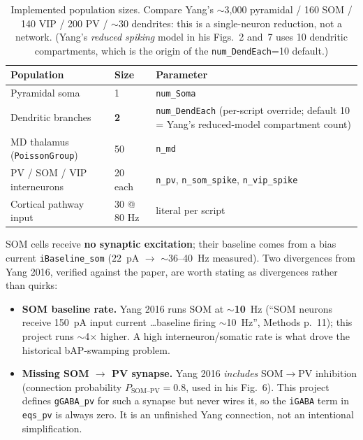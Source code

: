 \documentclass[11pt,a4paper]{article}
\begin{document}
\begin{table}[H]
    \centering
    \small
    \begin{tabular}{@{}lll@{}}
    \toprule
    \textbf{Population} & \textbf{Size} & \textbf{Parameter} \\ \midrule
    Pyramidal soma                & 1           & \texttt{num\_Soma} \\
    Dendritic branches            & \textbf{2}  & \texttt{num\_DendEach} (per-script override; default 10 = Yang's reduced-model compartment count) \\
    MD thalamus (\texttt{PoissonGroup}) & 50    & \texttt{n\_md} \\
    PV / SOM / VIP interneurons   & 20 each     & \texttt{n\_pv}, \texttt{n\_som\_spike}, \texttt{n\_vip\_spike} \\
    Cortical pathway input        & 30 @ 80 Hz  & literal per script \\ \bottomrule
    \end{tabular}
    \caption{Implemented population sizes. Compare Yang's $\sim$3{,}000 pyramidal / 160
    SOM / 140 VIP / 200 PV / $\sim$30 dendrites: this is a single-neuron reduction, not a
    network. (Yang's \emph{reduced spiking} model in his Figs.~2 and~7 uses 10 dendritic
    compartments, which is the origin of the \texttt{num\_DendEach}=10 default.)}
\end{table}

SOM cells receive \textbf{no synaptic excitation}; their baseline comes from a bias
current \texttt{iBaseline\_som} ($22$~pA $\rightarrow$ $\sim$36--40~Hz measured). Two
divergences from Yang 2016, verified against the paper, are worth stating as divergences
rather than quirks:
\begin{itemize}
    \item \textbf{SOM baseline rate.} Yang 2016 runs SOM at $\sim$\textbf{10}~Hz
      (``SOM neurons receive 150~pA input current \dots baseline firing $\sim$10~Hz'',
      Methods p.~11); this project runs $\sim$4$\times$ higher. A high interneuron/somatic
      rate is what drove the historical bAP-swamping problem.
    \item \textbf{Missing SOM $\rightarrow$ PV synapse.} Yang 2016 \emph{includes}
      SOM$\rightarrow$PV inhibition (connection probability $P_{\text{SOM--PV}}=0.8$, used
      in his Fig.~6). This project defines \texttt{gGABA\_pv} for such a synapse but never
      wires it, so the \texttt{iGABA} term in \texttt{eqs\_pv} is always zero. It is an
      unfinished Yang connection, not an intentional simplification.
\end{itemize}
\end{document}
